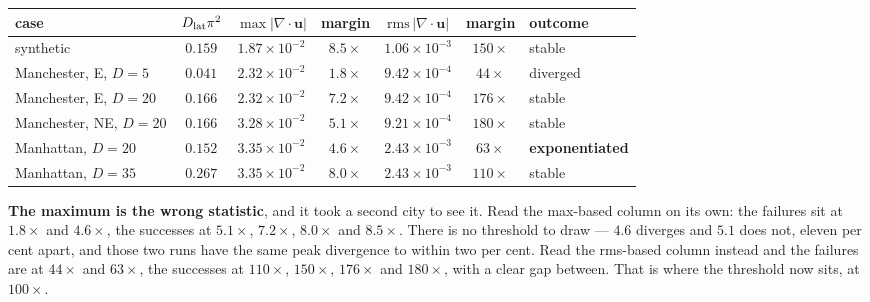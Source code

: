 \documentclass[11pt,a4paper]{article}
\newcommand{\uu}{\bm{u}}
\begin{document}
\begin{center}
\begin{tabular}{lcccccl}
\toprule
case & $D_{\rm lat}\pi^2$ &
$\max|\nabla\!\cdot\!\uu|$ & margin &
$\mathrm{rms}\,|\nabla\!\cdot\!\uu|$ & margin & outcome \\
\midrule
synthetic              & $0.159$ & $1.87\!\times\!10^{-2}$ & $8.5\times$ & $1.06\!\times\!10^{-3}$ & $150\times$ & stable \\
Manchester, E, $D=5$   & $0.041$ & $2.32\!\times\!10^{-2}$ & $1.8\times$ & $9.42\!\times\!10^{-4}$ & $44\times$  & diverged \\
Manchester, E, $D=20$  & $0.166$ & $2.32\!\times\!10^{-2}$ & $7.2\times$ & $9.42\!\times\!10^{-4}$ & $176\times$ & stable \\
Manchester, NE, $D=20$ & $0.166$ & $3.28\!\times\!10^{-2}$ & $5.1\times$ & $9.21\!\times\!10^{-4}$ & $180\times$ & stable \\
Manhattan, $D=20$      & $0.152$ & $3.35\!\times\!10^{-2}$ & $4.6\times$ & $2.43\!\times\!10^{-3}$ & $63\times$  & \textbf{exponentiated} \\
Manhattan, $D=35$      & $0.267$ & $3.35\!\times\!10^{-2}$ & $8.0\times$ & $2.43\!\times\!10^{-3}$ & $110\times$ & stable \\
\bottomrule
\end{tabular}
\end{center}

\noindent \textbf{The maximum is the wrong statistic}, and it took a second city
to see it. Read the max-based column on its own: the failures sit at $1.8\times$
and $4.6\times$, the successes at $5.1\times$, $7.2\times$, $8.0\times$ and
$8.5\times$. There is no threshold to draw --- $4.6$ diverges and $5.1$ does not,
eleven per cent apart, and those two runs have the same peak divergence to within
two per cent. Read the rms-based column instead and the failures are at
$44\times$ and $63\times$, the successes at $110\times$, $150\times$, $176\times$
and $180\times$, with a clear gap between. That is where the threshold now sits,
at $100\times$.
\end{document}
